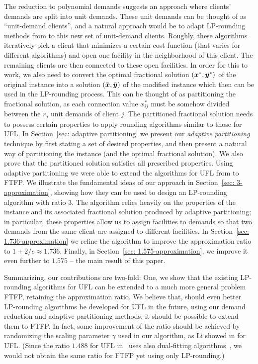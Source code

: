 \documentclass[11pt]{article}
\begin{document}
The reduction to polynomial demands suggests an approach
where clients' demands are split into unit demands. These
unit demands can be thought of as ``unit-demand clients'',
and a natural approach would be to adapt LP-rounding methods
from \cite{gupta08,ChudakS04,ByrkaGS10} to this new set of
unit-demand clients.  Roughly, these algorithms iteratively
pick a client that minimizes a certain cost function (that
varies for different algorithms) and open one facility in
the neighborhood of this client. The remaining clients are
then connected to these open facilities.  In order for this
to work, we also need to convert the optimal fractional
solution $(\boldsymbol{x}^\ast,\boldsymbol{y}^\ast)$ of the original instance
into a solution $(\bar{\boldsymbol{x}},\bar{\boldsymbol{y}})$ of the modified instance
which then can be used in the LP-rounding process. This can
be thought of as partitioning the fractional solution, as
each connection value $x^\ast_{ij}$ must be somehow divided
between the $r_j$ unit demands of client $j$. The
partitioned fractional solution needs to possess certain
properties to apply rounding algorithms similar to those for
UFL. In Section~\ref{sec: adaptive partitioning} we present
our \emph{adaptive partitioning} technique by first stating
a set of desired properties, and then present a natural way
of partitioning the instance (and the optimal fractional
solution). We also prove that the partitioned solution
satisfies all prescribed properties. Using adaptive
partitioning we were able to extend the algorithms for UFL
from \cite{gupta08,ChudakS04,ByrkaGS10} to FTFP. We
illustrate the fundamental ideas of our approach in
Section~\ref{sec: 3-approximation}, showing how they can be
used to design an LP-rounding algorithm with ratio $3$. The
algorithm relies heavily on the properties of the instance
and its associated fractional solution produced by adaptive
partitioning; in particular, these properties allow us to
assign facilities to demands so that two demands from the
same client are assigned to different facilities.  In
Section~\ref{sec: 1.736-approximation} we refine the
algorithm to improve the approximation ratio to
$1+2/e\approx 1.736$.  Finally, in Section~\ref{sec:
  1.575-approximation}, we improve it even further to
$1.575$ -- the main result of this paper.

Summarizing, our contributions are two-fold: One, we show
that the existing LP-rounding algorithms for UFL can be
extended to a much more general problem FTFP, retaining the
approximation ratio. We believe that, should even better
LP-rounding algorithms be developed for UFL in the future,
using our demand reduction and adaptive partitioning
methods, it should be possible to extend them to FTFP.
In fact, some improvement of the ratio
should be achieved by randomizing the scaling parameter
$\gamma$ used in our algorithm, as Li showed in \cite{Li11}
for UFL.  (Since the ratio $1.488$ for UFL in~\cite{Li11}
uses also dual-fitting
algorithms~\cite{MahdianYZ06}, we would not obtain the same
ratio for FTFP yet using only LP-rounding.)
\end{document}
